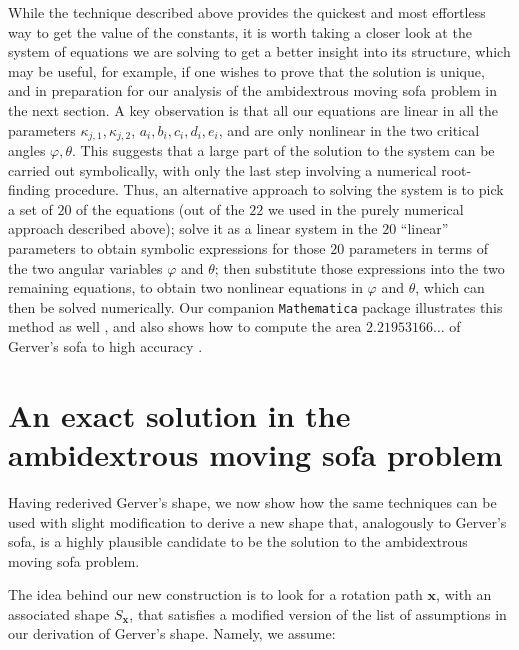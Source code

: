 \documentclass[11pt]{article}
\begin{document}
While the technique described above provides the quickest and most effortless way to get the value of the constants, it is worth taking a closer look at the system of equations we are solving to get a better insight into its structure, which may be useful, for example, if one wishes to prove that the solution is unique, and in preparation for our analysis of the ambidextrous moving sofa problem in the next section. A key observation is that all our equations are linear in all the parameters $\kappa_{j,1}, \kappa_{j,2}$, $a_i,b_i,c_i,d_i,e_i$, and are only nonlinear in the two critical angles $\varphi, \theta$. 
This suggests that a large part of the solution to the system can be carried out symbolically, with only the last step involving a numerical root-finding procedure. Thus, an alternative approach to solving the system is to pick a set of $20$ of the equations (out of the $22$ we used in the purely numerical approach described above); solve it as a linear system in the $20$ ``linear'' parameters to obtain symbolic expressions for those $20$ parameters in terms of the two angular variables $\varphi$ and $\theta$; then substitute those expressions into the two remaining equations, to obtain two nonlinear equations in $\varphi$ and $\theta$, which can then be solved numerically. Our companion \texttt{Mathematica} package illustrates this method as well \cite[Section~7]{romik-sofa-mathematica}, and also shows how to compute the area $2.21953166\ldots$ of Gerver's sofa to high accuracy \cite[Section~8]{romik-sofa-mathematica}.  

\section{An exact solution in the ambidextrous moving sofa problem}

\label{sec:ambidextrous}

Having rederived Gerver's shape, we now show how the same techniques can be used with slight modification to derive a new shape that, analogously to Gerver's sofa, is a highly plausible candidate to be the solution to the ambidextrous moving sofa problem.

The idea behind our new construction is to look for a rotation path $\mathbf{x}$, with an associated shape $S_{\mathbf{x}}$, that satisfies a modified version of the list of assumptions in our derivation of Gerver's shape. Namely, we assume:
\end{document}
